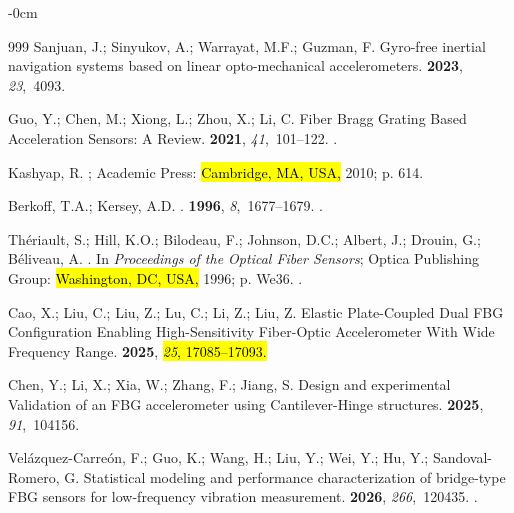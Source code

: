 \documentclass[sensors,article,accept,pdftex,moreauthors]{Definitions/mdpi}
\begin{document}
\begin{adjustwidth}{-\extralength}{0cm}
\begin{thebibliography}{999}
Sanjuan, J.; Sinyukov, A.; Warrayat, M.F.; Guzman, F.
\newblock Gyro-free inertial navigation systems based on linear opto-mechanical accelerometers.
 {\bf 2023}, {\em 23},~4093.

Guo, Y.; Chen, M.; Xiong, L.; Zhou, X.; Li, C.
\newblock Fiber Bragg Grating Based Acceleration Sensors: A Review.
 {\bf 2021}, {\em 41},~101--122.
.

Kashyap, R.
; Academic Press:  \hl{Cambridge, MA, USA,} %
 2010; p. 614.

Berkoff, T.A.; Kersey, A.D.
.
 {\bf 1996}, {\em 8},~1677--1679.
.

Th\'{e}riault, S.; Hill, K.O.; Bilodeau, F.; Johnson, D.C.; Albert, J.; Drouin, G.; B\'{e}liveau, A.
.
\newblock In \emph{Proceedings of the Optical Fiber Sensors}; Optica Publishing Group: \hl{Washington, DC, USA,}  1996; p. We36.
.

Cao, X.; Liu, C.; Liu, Z.; Lu, C.; Li, Z.; Liu, Z.
\newblock Elastic Plate-Coupled Dual FBG Configuration Enabling High-Sensitivity Fiber-Optic Accelerometer With Wide Frequency Range.
 {\bf 2025}, \hl{\emph{25}, 17085--17093.}

Chen, Y.; Li, X.; Xia, W.; Zhang, F.; Jiang, S.
\newblock Design and experimental Validation of an FBG accelerometer using Cantilever-Hinge structures.
 {\bf 2025}, {\em 91},~104156.

Velázquez-Carreón, F.; Guo, K.; Wang, H.; Liu, Y.; Wei, Y.; Hu, Y.; Sandoval-Romero, G.
\newblock Statistical modeling and performance characterization of bridge-type FBG sensors for low-frequency vibration measurement.
 {\bf 2026}, {\em 266},~120435.
.


\end{thebibliography}
\end{adjustwidth}
\end{document}
